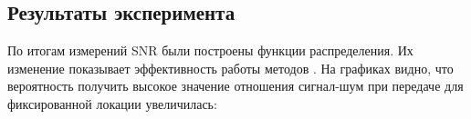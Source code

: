 \documentclass[a4paper,12pt,oneside, abstract=true]{scrartcl}
\begin{document}
\subsection{Результаты эксперимента}

По итогам измерений SNR были построены функции распределения. Их изменение показывает эффективность работы методов \cite{B1}. На графиках видно, что вероятность получить высокое значение отношения сигнал-шум при передаче для фиксированной локации увеличилась:
\begin{figure}[!htb]
\begin{minipage}[h]{0.49\linewidth}
 \\
\end{minipage}
\begin{minipage}[h]{0.49\linewidth}
 \\
\end{minipage}
\vfill
\begin{minipage}[h]{0.49\linewidth}

\end{minipage}
\end{figure}
\end{document}
